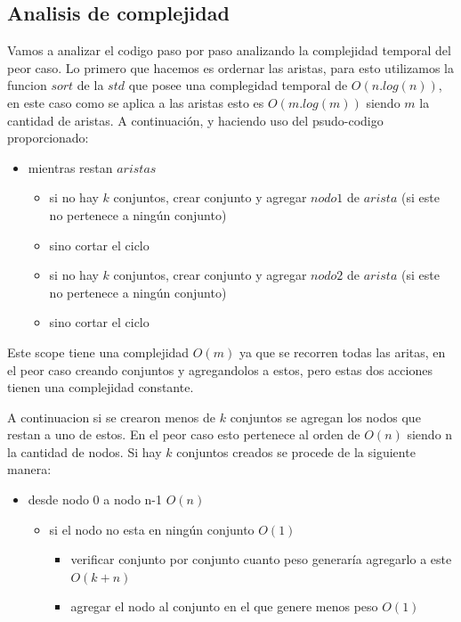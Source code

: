\subsection{Analisis de complejidad}

Vamos a analizar el codigo paso por paso analizando la complejidad temporal del peor caso.
Lo primero que hacemos es ordernar las aristas, para esto utilizamos la funcion $sort$ de la $std$ que posee una complegidad temporal de $O(n.log(n))$, en este caso como se aplica a las aristas esto es $O(m.log(m))$ siendo $m$ la cantidad de aristas.
A continuación, y haciendo uso del psudo-codigo proporcionado:
\begin{itemize}
\item mientras restan $aristas$ 
  \begin{itemize}
  \item si no hay $k$ conjuntos, crear conjunto y agregar $nodo1$ de $arista$ (si este no pertenece a ningún conjunto)
  \item sino cortar el ciclo  
  \item si no hay $k$ conjuntos, crear conjunto y agregar $nodo2$ de $arista$ (si este no pertenece a ningún conjunto)
  \item sino cortar el ciclo  
  \end{itemize}
\end{itemize}
Este scope tiene una complejidad $O(m)$ ya que se recorren todas las aritas, en el peor caso creando conjuntos y agregandolos a estos, pero estas dos acciones tienen una complejidad constante.

A continuacion si se crearon menos de $k$ conjuntos se agregan los nodos que restan a uno de estos. En el peor caso esto pertenece al orden de $O(n)$ siendo n la cantidad de nodos.
Si hay $k$ conjuntos creados se procede de la siguiente manera:
\begin{itemize}
\item desde nodo 0 a nodo n-1   $O(n)$
  \begin{itemize}
  \item si el nodo no esta en ningún conjunto $O(1)$
    \begin{itemize}
      \item verificar conjunto por conjunto cuanto peso generaría agregarlo a este $O(k+n)$
      \item agregar el nodo al conjunto en el que genere menos peso $O(1)$
    \end{itemize}
  \end{itemize}
\end{itemize}

